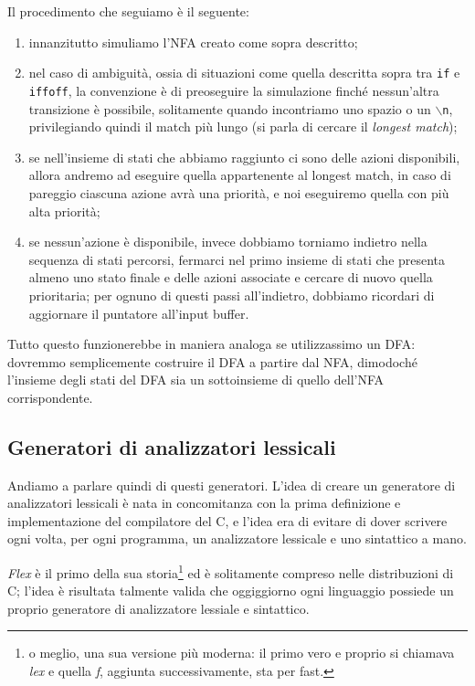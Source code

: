 \documentclass[class=book, crop=false, oneside, 12pt]{standalone}
\begin{document}
Il procedimento che seguiamo è il seguente:
\begin{enumerate}
    \item innanzitutto simuliamo l'NFA creato come sopra descritto;
    \item nel caso di ambiguità, ossia di situazioni come quella descritta sopra tra \texttt{if} e \texttt{iffoff}, la convenzione è di preoseguire la simulazione finché nessun’altra transizione è possibile, solitamente quando incontriamo uno spazio o un \texttt{\(\backslash\)n}, privilegiando quindi il match più lungo (si parla di cercare il \emph{longest match});
    \item se nell'insieme di stati che abbiamo raggiunto ci sono delle azioni disponibili, allora andremo ad eseguire quella appartenente al longest match, in caso di pareggio ciascuna azione avrà una priorità, e noi eseguiremo quella con più alta priorità;
    \item se nessun'azione è disponibile, invece dobbiamo torniamo indietro nella sequenza di stati percorsi, fermarci nel primo insieme di stati che presenta almeno uno stato finale e delle azioni associate e cercare di nuovo quella prioritaria; per ognuno di questi passi all'indietro, dobbiamo ricordari di aggiornare il puntatore all'input buffer.
\end{enumerate}

Tutto questo funzionerebbe in maniera analoga se utilizzassimo un DFA: dovremmo semplicemente costruire il DFA a partire dal NFA, dimodoché l'insieme degli stati del DFA sia un sottoinsieme di quello dell'NFA corrispondente.

\subsection{Generatori di analizzatori lessicali}
Andiamo a parlare quindi di questi generatori. L'idea di creare un generatore di analizzatori lessicali è nata in concomitanza con la prima definizione e implementazione del compilatore del C, e l'idea era di evitare di dover scrivere ogni volta, per ogni programma, un analizzatore lessicale e uno sintattico a mano.

\emph{Flex} è il primo della sua storia\footnote{o meglio, una sua versione più moderna: il primo vero e proprio si chiamava \emph{lex} e quella \emph{f}, aggiunta successivamente, sta per fast.} ed è solitamente compreso nelle distribuzioni di C; l'idea è risultata talmente valida che oggiggiorno ogni linguaggio possiede un proprio generatore di analizzatore lessiale e sintattico.
\end{document}
